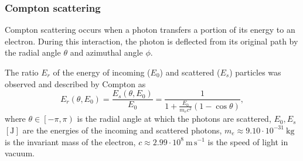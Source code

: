 \documentclass[a4paper,12pt,titlepage, twoside]{article}
\newcommand{\unit}[2]{$#1~\ensuremath{\mathrm{#2}}$}
\begin{document}


\subsubsection{Compton scattering}

Compton scattering occurs when a photon transfers a portion of its energy to an electron.
During this interaction, the photon is deflected from its original path by the radial angle $\theta$ and azimuthal angle $\phi$.

The ratio $E_r$ of the energy of incoming ($E_{0}$) and scattered ($E_{s}$) particles was observed and described by Compton as
\begin{equation}
  E_r\left(\theta, E_0\right) = \frac{E_s\left(\theta, E_0\right)}{E_{0}} = \frac{1}{1 + \frac{E_0}{m_ec^2}\left(1 - \cos\theta\right)},
\end{equation}
where $\theta \in \left[-\pi, \pi\right)$ is the radial angle at which the photons are scattered, $E_0, E_s$ $\left[\mathrm{J}\right]$ are the energies of the incoming and scattered photons, \unit{m_e \approx 9.10 \cdot 10^{-31}}{kg} is the invariant mass of the electron, \unit{c \approx 2.99 \cdot 10^{8}}{m\,s^{-1}} is the speed of light in vacuum.
\end{document}
